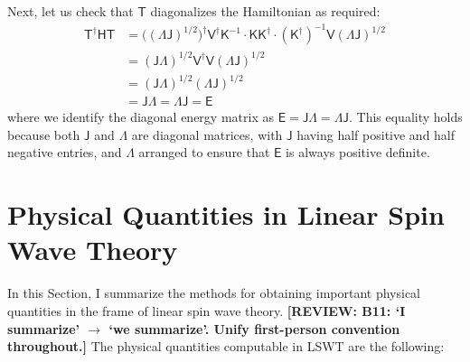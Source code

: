 \documentclass[aps, prx, nofootinbib, superscriptaddress]{revtex4-2}
\newcommand{\REVIEW}[1]{{\color{reviewcolor}\bfseries [REVIEW: #1]}}
\begin{document}
Next, let us check that $\mathsf{T}$ diagonalizes the Hamiltonian as required:
\begin{align*}
    \mathsf{T}^{\dagger} \mathsf{HT}
    &= \big( \mathsf{(\Lambda J)}^{1/2} \big)^{\dagger} \mathsf{V}^{\dagger} \mathsf{K}^{-1} \cdot \mathsf{KK}^{\dagger} \cdot (\mathsf{K}^{\dagger})^{-1} \mathsf{V} \mathsf{(\Lambda J)}^{1/2} \\
    &= \mathsf{(J\Lambda)}^{1/2} \mathsf{V}^{\dagger} \mathsf{V} \mathsf{(\Lambda J)}^{1/2} \\
    &= \mathsf{(J\Lambda)}^{1/2} \mathsf{(\Lambda J)}^{1/2} \\
    &= \mathsf{J\Lambda} = \mathsf{\Lambda J} = \mathsf{E}
\end{align*}
where we identify the diagonal energy matrix as $\mathsf{E} = \mathsf{J\Lambda} = \mathsf{\Lambda J}$. This equality holds because both $\mathsf{J}$ and $\mathsf{\Lambda}$ are diagonal matrices, with $\mathsf{J}$ having half positive and half negative entries, and $\mathsf{\Lambda}$ arranged to ensure that $\mathsf{E}$ is always positive definite.



\newpage



\section{Physical Quantities in Linear Spin Wave Theory}

In this Section, I summarize the methods for obtaining important physical quantities in the frame of linear spin wave theory.
\REVIEW{B11: `I summarize' $\to$ `we summarize'. Unify first-person convention throughout.}
The physical quantities computable in LSWT are the following:
\end{document}
